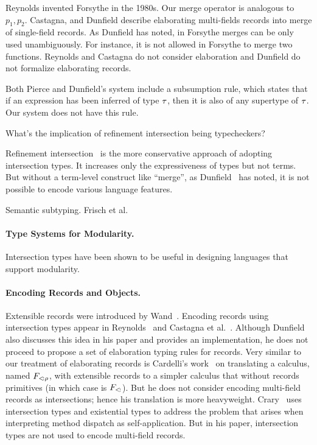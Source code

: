 Reynolds invented Forsythe in the 1980s. Our merge operator is analogous to
$ p_1, p_2 $. Castagna, and Dunfield describe elaborating multi-fields records
into merge of single-field records. As Dunfield has noted, in Forsythe merges
can be only used unambiguously.
For instance, it is not allowed in Forsythe to
merge two functions. Reynolds and Castagna do not consider elaboration and
Dunfield do not formalize elaborating records.

Both Pierce and Dunfield's system include a subsumption rule, which states that
if an expression has been inferred of type $ \tau $, then it is also of any
supertype of $ \tau $. Our system does not have this rule.

What's the implication of refinement intersection being typecheckers?

Refinement intersection~\cite{dunfield2007refined,freeman1991refinement} is the
more conservative approach of adopting intersection types. It increases only the
expressiveness of types but not terms. But without a term-level construct like
``merge'', as Dunfield~\cite{dunfield2014elaborating} has noted, it is not
possible to encode various language features. \cite{davies2005practical}
\cite{dunfield2007refined}

Semantic subtyping. Frisch et al.~\cite{frisch2008semantic}

\paragraph{Type Systems for Modularity.}

Intersection types have been shown to be useful in designing languages that
support modularity.~\cite{nystrom2006j}

\cite{oliveira2013feature}

\paragraph{Encoding Records and Objects.}

\cite{harper1991record}


Extensible records were introduced by Wand~\cite{wand1987complete}. Encoding
records using intersection types appear in Reynolds~\cite{reynolds1997design}
and Castagna et al.~\cite{castagna1995calculus}. Although Dunfield also
discusses this idea in his paper \cite{dunfield2014elaborating} and provides an
implementation, he does not proceed to propose a set of elaboration typing rules
for records. Very similar to our treatment of elaborating records is Cardelli's
work~\cite{cardelli1992extensible} on translating a calculus, named
$ F_{<\!: \rho}$, with extensible records to a simpler calculus that without
records primitives (in which case is $ F_{<\!:} $). But he does not consider
encoding multi-field records as intersections; hence his translation is more
heavyweight. Crary~\cite{crary1998simple} uses intersection types and
existential types to address the problem that arises when interpreting method
dispatch as self-application. But in his paper, intersection types are not used
to encode multi-field records.

